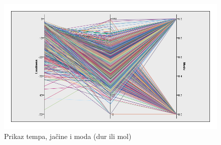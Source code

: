 \begin{figure}[H]
    \centering
    \includegraphics[scale=0.4]{resources/tempo-loudness-mode.png}
    \caption{Prikaz tempa, ja\v{c}ine i moda (dur ili mol)}
    \label{fig:TempoMode}
\end{figure}
